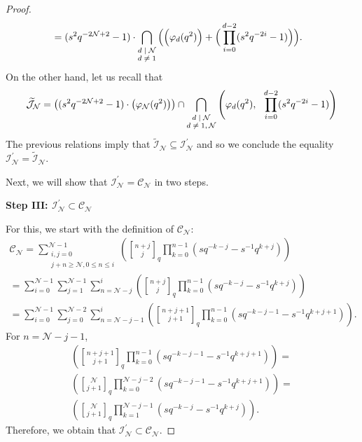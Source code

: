 \documentclass[reqno,a4paper,11pt]{amsart}
\numberwithin{equation}{section}
\numberwithin{figure}{section}
\theoremstyle{definition}
\theoremstyle{plain}
\newcommand{\cC}{\mathcal{C}}
\newcommand{\cI}{\mathcal{I}}
\newcommand{\cJ}{\mathcal{J}}
\newcommand{\cN}{\mathcal{N}}
\renewcommand{\geq}{\geqslant}
\renewcommand{\leq}{\leqslant}
\begin{document}
\begin{proof}
\begin{equation*}
\begin{aligned}
 &=(s^2 q^{-2\cN+2}-1) \cdot \bigcap_{\text{\scriptsize$\begin{matrix}
 d\mid \cN \\ d \neq 1 \end{matrix}$}} \Big(\Big( \varphi_d(q^2)\Big) +
  \Big(\prod_{i=0}^{d-2}(s^2q^{-2i}-1) \Big) \Big).
 \end{aligned}
\end{equation*} 
On the other hand, let us recall that 
\begin{equation*}
\widetilde{\cJ}_\cN =   
\left((s^2 q^{-2\cN+2} - 1) \cdot\left(\varphi_\cN(q^2)\right)\right) \cap
 \bigcap_{\text{\scriptsize$\begin{matrix}
 d\mid \cN \\ d \neq 1, \cN \end{matrix}$}}
 \left(\varphi_d(q^2),\ \  \prod_{i=0}^{d-2}(s^2q^{-2i}-1) \right)
\end{equation*}
%
The previous relations imply that $\widetilde{\cI}_\cN \subseteq \cI_\cN^\prime$ and so we conclude the equality $\cI_\cN^\prime = \widetilde{\cI}_\cN$.  
%
%
\par
Next, we will show that $\cI_{\cN}^\prime = \cC_{\cN}$ in two steps.
%
\par
{\bf Step III: $\cI_{\cN}^\prime \subset \cC_{\cN}$ } 
\par
For this, we start with the definition of $\cC_\cN$:
\begin{multline*}
\cC_\cN= \sum_{\substack{i,j=0 \\ j+n\geq \cN,0\leq  n\leq i}}^{\cN-1}
 \left( {n+j \brack j}_q \prod_{k=0}^{n-1}(sq^{-k-j}-s^{-1}q^{k+j}) \right) 
 \\
 =
 \sum_{i=0}^{\cN-1}
 \sum_{j=1}^{\cN-1}
 \sum_{n=\cN-j}^{i}
 \left( {n+j \brack j}_q \prod_{k=0}^{n-1}(sq^{-k-j}-s^{-1}q^{k+j}) \right) 
 \\=
 \sum_{i=0}^{\cN-1}
 \sum_{j=0}^{\cN-2}
 \sum_{n=\cN-j-1}^{i}
 \left( {n+j+1 \brack j+1}_q \prod_{k=0}^{n-1}(sq^{-k-j-1}-s^{-1}q^{k+j+1}) \right).  
\end{multline*}
For $n=\cN-j-1$, 
\begin{multline*}
 \left( {n+j+1 \brack j+1}_q \prod_{k=0}^{n-1}(sq^{-k-j-1}-s^{-1}q^{k+j+1}) \right)  
 =
 \\
  \left( {\cN \brack j+1}_q \prod_{k=0}^{\cN-j-2}(sq^{-k-j-1}-s^{-1}q^{k+j+1}) \right)  
  =
  \\
   \left( {\cN \brack j+1}_q \prod_{k=1}^{\cN-j-1}(sq^{-k-j}-s^{-1}q^{k+j}) \right).
\end{multline*}
Therefore, we obtain that $\cI_{\cN}^\prime \subset \cC_{\cN}$.  

\end{proof}
\end{document}

